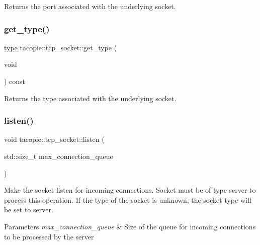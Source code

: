 \begin{DoxyReturn}{Returns}
the port associated with the underlying socket. 
\end{DoxyReturn}
\mbox{\label{classtacopie_1_1tcp__socket_a4f663be51b845520505bc20a88b411ee}} 
\subsubsection{\texorpdfstring{get\+\_\+type()}{get\_type()}}
{\footnotesize\ttfamily \hyperlink{classtacopie_1_1tcp__socket_ad8376e85df96ab9523f5d079ed7172ab}{type} tacopie\+::tcp\+\_\+socket\+::get\+\_\+type (\begin{DoxyParamCaption}\item[{void}]{ }\end{DoxyParamCaption}) const}

\begin{DoxyReturn}{Returns}
the type associated with the underlying socket. 
\end{DoxyReturn}
\mbox{\label{classtacopie_1_1tcp__socket_af0957ded2a84fb06d940cba98df477fb}} 
\subsubsection{\texorpdfstring{listen()}{listen()}}
{\footnotesize\ttfamily void tacopie\+::tcp\+\_\+socket\+::listen (\begin{DoxyParamCaption}\item[{std\+::size\+\_\+t}]{max\+\_\+connection\+\_\+queue }\end{DoxyParamCaption})}

Make the socket listen for incoming connections. Socket must be of type server to process this operation. If the type of the socket is unknown, the socket type will be set to server.


\begin{DoxyParams}{Parameters}
{\em max\+\_\+connection\+\_\+queue} & Size of the queue for incoming connections to be processed by the server \\
\hline
\end{DoxyParams}
\mbox{\label{classtacopie_1_1tcp__socket_a76f69612969374b5aa542378d37ee398}} 
